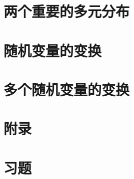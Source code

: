 \pending

\section{两个重要的多元分布}

\pending

\section{随机变量的变换}

\pending

\section{多个随机变量的变换}

\pending

\section{附录}

\pending

\section{习题}

\pending
